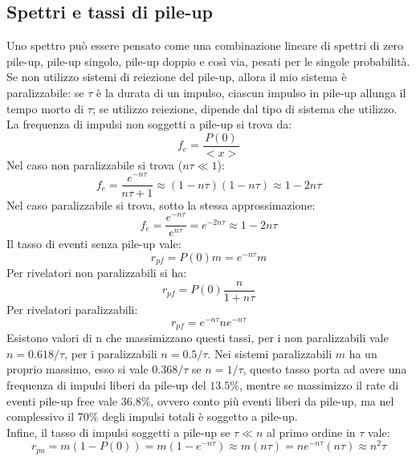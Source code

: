 \subsection{Spettri e tassi di pile-up}
Uno spettro pu\`o essere pensato come una combinazione lineare di spettri di zero pile-up, pile-up singolo, pile-up doppio e cos\`i via, pesati
per le singole probabilit\`a.
Se non utilizzo sistemi di reiezione del pile-up, allora il mio sistema \`e paralizzabile: se $\tau$ \`e la durata di un impulso, ciascun impulso
in pile-up allunga il tempo morto di $\tau$; se utilizzo reiezione, dipende dal tipo di sistema che utilizzo.\\
La frequenza di impulsi non soggetti a pile-up si trova da:
\begin{equation*}
f_e = \frac{P(0)}{<x>}
\end{equation*}
Nel caso non paralizzabile si trova ($n\tau \ll 1$):
\begin{equation*}
f_e = \frac{e^{-n\tau}}{n\tau + 1} \approx (1-n\tau)(1-n\tau) \approx 1-2n\tau
\end{equation*}
Nel caso paralizzabile si trova, sotto la stessa approssimazione:
\begin{equation*}
f_e = \frac{e^{-n\tau}}{e^{n\tau}} = e^{-2n\tau} \approx 1-2n\tau
\end{equation*}
Il tasso di eventi senza pile-up vale:
\begin{equation*}
r_{pf} = P(0) m  = e^{-n\tau} m
\end{equation*}
Per rivelatori non paralizzabili si ha:
\begin{equation*}
r_{pf} = P(0) \frac{n}{1+n\tau} 
\end{equation*}
Per rivelatori paralizzabili:
\begin{equation*}
r_{pf} = e^{-n\tau} n e^{-n\tau}
\end{equation*}
Esistono valori di n che massimizzano questi tassi, per i non paralizzabili vale $n = 0.618/\tau$, per i paralizzabili $n=0.5/\tau$.
Nei sistemi paralizzabili $m$ ha un proprio massimo, esso si vale $0.368/\tau$ se $n=1/\tau$, questo tasso porta ad avere una frequenza
di impulsi liberi da pile-up del $13.5\%$, mentre se massimizzo il rate di eventi pile-up free vale $36.8\%$, ovvero conto pi\`u eventi
liberi da pile-up, ma nel complessivo il 70\% degli impulsi totali \`e soggetto a pile-up.\\
Infine, il tasso di impulsi soggetti a pile-up se $\tau \ll n$  al primo ordine in $\tau$ vale:
\begin{equation*}
r_{pu} = m (1-P(0)) = m (1 - e^{-n\tau}) \approx m (n \tau) = n e^{-n\tau} (n\tau) \approx n^2 \tau 
\end{equation*}